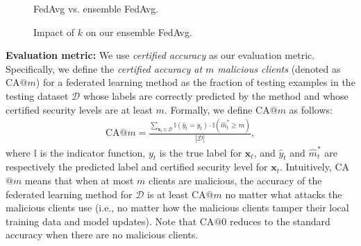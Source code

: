 \documentclass[letterpaper]{article} %
\begin{document}
\begin{figure}[!t]
    \center
    \caption{FedAvg vs. ensemble FedAvg.}
    \label{fig:q_compare}
\end{figure}

\begin{figure}[!t]
    \center
    \caption{Impact of $k$ on our ensemble FedAvg.}
    \label{fig:k}
\end{figure}


\noindent
{\bf Evaluation metric:}
We use  \emph{certified accuracy} as our evaluation metric.
Specifically, we define the \emph{certified accuracy at $m$ malicious clients} (denoted as CA$@m$) for a federated learning method as the fraction of testing examples in the testing dataset $\mathcal{D}$ whose labels are correctly predicted by the method and whose certified security levels are at least $m$. Formally, we define CA$@m$ as follows:
\begin{align}
\text{CA}@m=\frac{\sum_{\mathbf{x}_t \in \mathcal{D}} \mathbb{I}(\hat{y}_t=y_t)\cdot \mathbb{I}(\hat{m}_{t}^{*}\geq m)}{|\mathcal{D}|},
\end{align}
where $\mathbb{I}$ is the indicator function, $y_t$ is the true label for $\mathbf{x}_t$, and $\hat{y}_t$ and $\hat{m}_{t}^{*}$ are respectively the predicted label and  certified security level for $\mathbf{x}_t$. Intuitively, CA$@m$ means that when at most $m$ clients are malicious, the accuracy of the federated learning method for $\mathcal{D}$ is at least CA$@m$ no matter what attacks the malicious clients use (i.e., no matter how the malicious clients tamper their local training data and model updates). Note that CA$@0$ reduces to the standard accuracy when there are no malicious clients.
\end{document}
